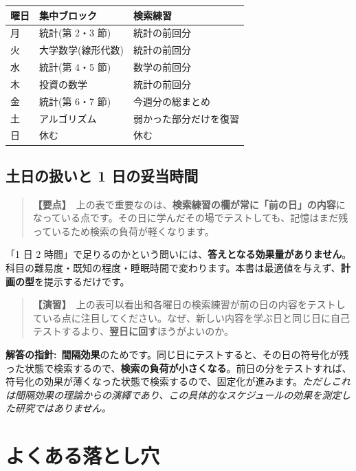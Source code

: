 \documentclass{article}
\begin{document}
\begin{center}
\begin{tabular}{|l|l|l|}
\hline
曜日 & 集中ブロック & 検索練習 \\
\hline
月 & 統計(第 2・3 節) & 統計の前回分 \\
火 & 大学数学(線形代数) & 統計の前回分 \\
水 & 統計(第 4・5 節) & 数学の前回分 \\
木 & 投資の数学 & 統計の前回分 \\
金 & 統計(第 6・7 節) & 今週分の総まとめ \\
土 & アルゴリズム & 弱かった部分だけを復習 \\
日 & 休む & 休む \\
\hline
\end{tabular}\end{center}

\subsection{土日の扱いと 1 日の妥当時間}

\begin{quote}
\textbf{【要点】}\ 上の表で重要なのは、\textbf{検索練習の欄が常に「前の日」の内容}になっている点です。その日に学んだその場でテストしても、記憶はまだ残っているため検索の負荷が軽くなります。
\end{quote}

「1 日 2 時間」で足りるのかという問いには、\textbf{答えとなる効果量がありません}。科目の難易度・既知の程度・睡眠時間で変わります。本書は最適値を与えず、\textbf{計画の型}を提示するだけです。

\begin{quote}
\textbf{【演習】}\ 上の表可以看出和各曜日の検索練習が前の日の内容をテストしている点に注目してください。なぜ、新しい内容を学ぶ日と同じ日に自己テストするより、\textbf{翌日に回す}ほうがよいのか。
\end{quote}

\textbf{解答の指針:}\ \textbf{間隔効果}のためです。同じ日にテストすると、その日の符号化が残った状態で検索するので、\textbf{検索の負荷が小さくなる}。前日の分をテストすれば、符号化の効果が薄くなった状態で検索するので、固定化が進みます。\emph{ただしこれは間隔効果の理論からの演繹であり、この具体的なスケジュールの効果を測定した研究ではありません。}


\section{よくある落とし穴}
\end{document}
